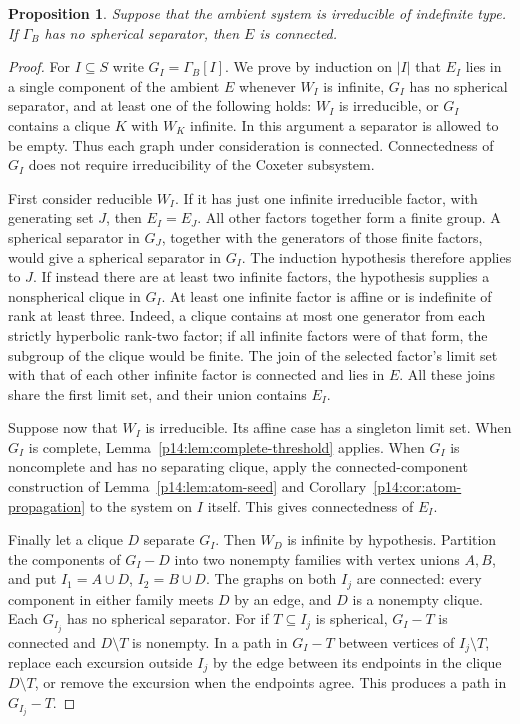 \documentclass[11pt,reqno]{amsart}
\theoremstyle{plain}
\newtheorem{proposition}[theorem]{Proposition}
\theoremstyle{definition}
\theoremstyle{remark}
\numberwithin{equation}{section}
\begin{document}
\begin{proposition}\label{p14:prop:clique-gluing}
Suppose that the ambient system is irreducible of indefinite type.
If $\Gamma_B$ has no spherical separator, then $E$ is connected.
\end{proposition}
\begin{proof}
For $I\subseteq S$ write $G_I=\Gamma_B[I]$. We prove by induction
on $|I|$ that $E_I$ lies in a single component of the ambient $E$
whenever $W_I$ is infinite, $G_I$ has no spherical separator,
and at least one of the following holds: $W_I$ is irreducible, or
$G_I$ contains a clique $K$ with $W_K$ infinite. In this argument
a separator is allowed to be empty. Thus each graph under
consideration is connected. Connectedness of $G_I$ does not
require irreducibility of the Coxeter subsystem.

First consider reducible $W_I$. If it has just one infinite
irreducible factor, with generating set $J$, then $E_I=E_J$.
All other factors together form a finite group. A spherical
separator in $G_J$, together with the generators of those finite
factors, would give a spherical separator in $G_I$. The induction
hypothesis therefore applies to $J$. If instead there are at least
two infinite factors, the hypothesis supplies a nonspherical
clique in $G_I$. At least one infinite factor is affine or is
indefinite of rank at least three. Indeed, a clique contains at
most one generator from each strictly hyperbolic rank-two factor;
if all infinite factors were of that form, the subgroup of the
clique would be finite. The join of the selected factor's limit
set with that of each other infinite factor is connected and lies
in $E$. All these joins share the first limit set, and their union
contains $E_I$.

Suppose now that $W_I$ is irreducible. Its affine case has a
singleton limit set. When $G_I$ is complete,
Lemma~\ref{p14:lem:complete-threshold} applies. When $G_I$ is
noncomplete and has no separating clique, apply the
connected-component construction of Lemma~\ref{p14:lem:atom-seed}
and Corollary~\ref{p14:cor:atom-propagation} to the system on $I$
itself. This gives connectedness of $E_I$.

Finally let a clique $D$ separate $G_I$. Then $W_D$ is infinite
by hypothesis. Partition the components of $G_I-D$ into two
nonempty families with vertex unions $A,B$, and put
$I_1=A\cup D$, $I_2=B\cup D$. The graphs on both $I_j$ are
connected: every component in either family meets $D$ by an edge,
and $D$ is a nonempty clique. Each $G_{I_j}$ has no spherical
separator. For if $T\subseteq I_j$ is spherical, $G_I-T$ is
connected and $D\setminus T$ is nonempty. In a path in $G_I-T$
between vertices of $I_j\setminus T$, replace each excursion
outside $I_j$ by the edge between its endpoints in the clique
$D\setminus T$, or remove the excursion when the endpoints agree.
This produces a path in $G_{I_j}-T$.


\end{proof}
\end{document}
